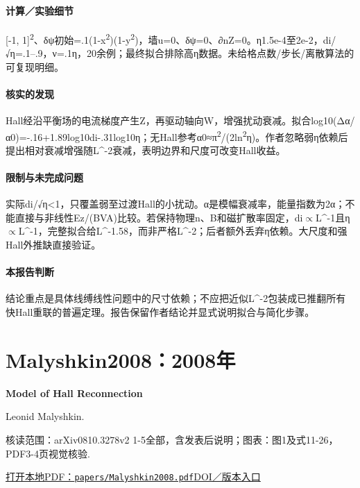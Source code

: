 \documentclass[UTF8,a4paper,11pt,openany,fontset=fandol]{ctexbook}
\begin{document}
\paragraph{计算／实验细节}[-1, 1]\textsuperscript{2}、δψ初始=.1(1-x\textsuperscript{2})(1-y\textsuperscript{2})，墙u=0、δψ=0、∂nZ=0。η1.5e-4至2e-2，di/√η=.1–.9，ν=.1η，20余例；最终拟合排除高η数据。未给格点数/步长/离散算法的可复现明细。

\paragraph{核实的发现}Hall经沿平衡场的电流梯度产生Z，再驱动轴向W，增强扰动衰减。拟合log10(Δα/α0)=-.16+1.89log10di-.31log10η；无Hall参考α0≈π\textsuperscript{2}/(2ln\textsuperscript{2}η)。作者忽略弱η依赖后提出相对衰减增强随L\textasciicircum{}-2衰减，表明边界和尺度可改变Hall收益。

\paragraph{限制与未完成问题}实际di/√η<1，只覆盖弱至过渡Hall的小扰动。α是模幅衰减率，能量指数为2α；不能直接与非线性Ez/(BVA)比较。若保持物理n、B和磁扩散率固定，di\ensuremath{\propto}L\textasciicircum{}-1且η\ensuremath{\propto}L\textasciicircum{}-1，完整拟合给L\textasciicircum{}-1.58，而非严格L\textasciicircum{}-2；后者额外丢弃η依赖。大尺度和强Hall外推缺直接验证。

\paragraph{本报告判断}结论重点是具体线缚线性问题中的尺寸依赖；不应把近似L\textasciicircum{}-2包装成已推翻所有快Hall重联的普遍定理。报告保留作者结论并显式说明拟合与简化步骤。

\section{Malyshkin2008：2008年}\label{paper:Malyshkin2008}

\textbf{Model of Hall Reconnection}\citep{Malyshkin2008}\

Leonid Malyshkin.

\textsf{核读范围：}arXiv0810.3278v2 1-5全部，含发表后说明；\textsf{图表：}图1及式11-26，PDF3-4页视觉核验.

\href{run:../papers/Malyshkin2008.pdf}{打开本地PDF：\texttt{papers/Malyshkin2008.pdf}}\quad\href{https://doi.org/10.1103/physrevlett.101.225001}{DOI／版本入口}
\end{document}
